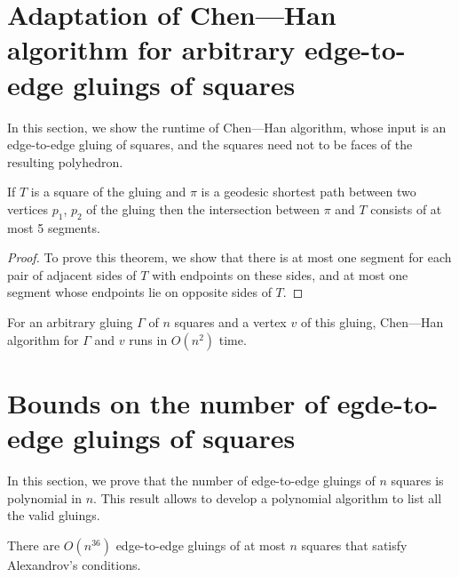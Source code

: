 \documentclass[a4paper,USenglish,cleveref, autoref, thm-restate]{socg-lipics-v2019}
\begin{document}
\section{Adaptation of Chen—Han algorithm for arbitrary edge-to-edge gluings of squares}

In this section, we show the runtime of Chen—Han algorithm, whose input is an edge-to-edge gluing of squares, and the squares need not to be faces of the resulting polyhedron.

\begin{theorem} \label{thm:shortestSquare}
	If $T$ is a square of the gluing and $\pi$ is a geodesic shortest path between two vertices $p_1$, $p_2$ of the gluing then the intersection between $\pi$ and $T$ consists of at most 5 segments.
\end{theorem}

\begin{proof}
	To prove this theorem, we show that there is at most one segment for each pair of adjacent sides of $T$ with endpoints on these sides, and at most one segment whose endpoints lie on opposite sides of $T$.
\end{proof}

\begin{corollary} \label{cor:chruntime}
	For an arbitrary gluing $\Gamma$ of $n$ squares and a vertex $v$ of this gluing, Chen—Han algorithm for $\Gamma$ and $v$ runs in $O(n^2)$ time.
\end{corollary}

\section{Bounds on the number of egde-to-edge gluings of squares}

In this section, we prove that the number of edge-to-edge gluings of $n$ squares is polynomial in $n$. This result allows to develop a polynomial algorithm to list all the valid gluings.

\begin{theorem} \label{thm:n36}
	There are $O \left( n^{36} \right)$ edge-to-edge gluings of at most $n$ squares that satisfy Alexandrov's conditions.
\end{theorem}
\end{document}
